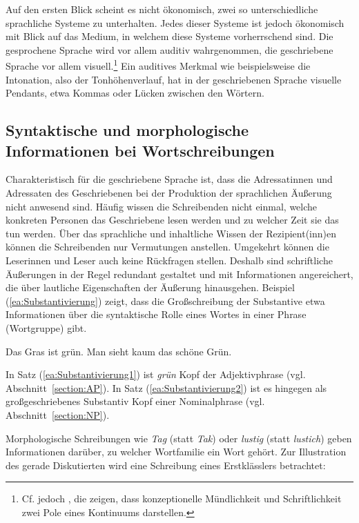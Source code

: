 Auf den ersten Blick scheint es nicht ökonomisch, zwei so unterschiedliche sprachliche Systeme zu unterhalten. Jedes dieser Systeme ist jedoch ökonomisch mit Blick auf das Medium, in welchem diese Systeme vorherrschend sind. Die gesprochene Sprache wird vor allem auditiv wahrgenommen, die geschriebene Sprache vor allem visuell.\footnote{Cf. jedoch \citet{KochOesterreicher2007}, die zeigen, dass konzeptionelle Mündlichkeit und Schriftlichkeit zwei Pole eines Kontinuums darstellen.} Ein auditives Merkmal wie beispielsweise die Intonation, also der Tonhöhenverlauf, hat in der geschriebenen Sprache visuelle Pendants, etwa Kommas oder Lücken zwischen den Wörtern.

\subsection{Syntaktische und morphologische Informationen bei Wortschreibungen}

Charakteristisch für die geschriebene Sprache ist, dass die Adressatinnen und Adressaten des Geschriebenen bei der Produktion der sprachlichen Äußerung nicht anwesend sind. Häufig wissen die Schreibenden nicht einmal, welche konkreten Personen das Geschriebene lesen werden und zu welcher Zeit sie das tun werden. Über das sprachliche und inhaltliche Wissen der Rezipient(inn)en können die Schreibenden nur Vermutungen anstellen. Umgekehrt können die Leserinnen und Leser auch keine Rückfragen stellen. Deshalb sind schriftliche Äußerungen in der Regel redundant gestaltet und mit Informationen angereichert, die über lautliche Eigenschaften der Äußerung hinausgehen. Beispiel (\ref{ea:Substantivierung}) zeigt, dass die Großschreibung der Substantive etwa Informationen über die syntaktische Rolle eines Wortes in einer Phrase (Wortgruppe) gibt.

\ea \label{ea:Substantivierung}
\ea \label{ea:Substantivierung1} Das Gras ist grün.
\ex \label{ea:Substantivierung2} Man sieht kaum das schöne Grün.
\z
\z

In Satz (\ref{ea:Substantivierung1}) ist \textit{grün} Kopf der Adjektivphrase (vgl. Abschnitt~\ref{section:AP}). In Satz (\ref{ea:Substantivierung2}) ist es hingegen als großgeschriebenes Substantiv Kopf einer Nominalphrase (vgl. Abschnitt~\ref{section:NP}). 

Morphologische Schreibungen wie \textit{Tag} (statt \textit{Tak}) oder \textit{lustig} (statt \textit{lustich}) geben Informationen darüber, zu welcher Wortfamilie ein Wort gehört. Zur Illustration des gerade Diskutierten wird eine Schreibung eines Erstklässlers betrachtet:

